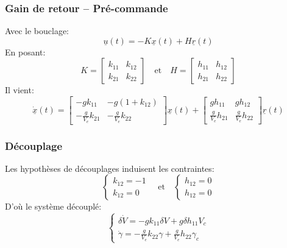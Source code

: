 \documentclass[tikz, footheight=2em]{beamer}
\begin{document}
\begin{frame}
    \frametitle{Gain de retour -- Pré-commande} \pause{}
    Avec le bouclage:
    \[
    \underline{u}(t) = -K \underline{x}(t) +
        H \underline{r}(t)
    \] \pause{}
    En posant:
    \[
    K =
    \left[
    \begin{array}{cc}
        k_{11} & k_{12} \\
        k_{21} & k_{22}
    \end{array}
    \right]\quad
    \text{et}\quad
    H =
    \left[
    \begin{array}{cc}
        h_{11} & h_{12} \\
        h_{21} & h_{22}
    \end{array}
    \right]
    \] \pause{}
    Il vient:
    \[
    \underline{\dot{x}}(t)
    =
    \left[
    \begin{array}{cc}
        -g k_{11} & -g (1+k_{12}) \\
        -\frac{g}{V_e} k_{21} & -\frac{g}{V_e} k_{22}
    \end{array}
    \right]
    \underline{x} (t)
    +
    \left[
    \begin{array}{cc}
        g h_{11} & g h_{12} \\
        \frac{g}{V_e} h_{21} & \frac{g}{V_e} h_{22}
    \end{array}
    \right]
    \underline{r} (t)
    \]
\end{frame}


\begin{frame}
    \frametitle{Découplage} \pause{}
    Les hypothèses de découplages induisent les contraintes:
    \[
    \left \{
    \begin{array}{l}
        k_{12} = -1 \\
        k_{12} = 0
    \end{array}
    \right.\quad
    \text{et}\quad
    \left \{
    \begin{array}{l}
        h_{12} = 0 \\
        h_{12} = 0
    \end{array}
    \right.
    \]
    \pause{}
    D'où le système découplé:
    \[
    \left \{
    \begin{array}{l}
        \delta \dot{V} = -g k_{11} \delta V + g \delta h_{11} V_c \\
        \dot{\gamma} = -\frac{g}{V_e} k_{22} \gamma + \frac{g}{V_e} h_{22} \gamma_c
    \end{array}
    \right.
    \]
\end{frame}
\end{document}
